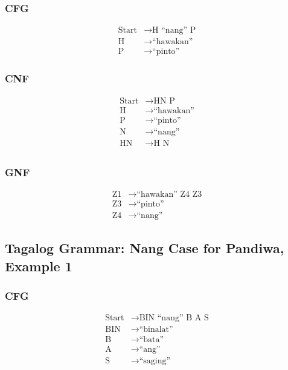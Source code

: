 \subsubsection{CFG}
\begin{equation*}
    \begin{aligned}
        \text{Start}   & \rightarrow \text{H “nang” P}   \\
        \text{H} & \rightarrow \text{“hawakan”} \\
        \text{P} & \rightarrow \text{“pinto”}
    \end{aligned}
\end{equation*}

\subsubsection{CNF}
\begin{equation*}
    \begin{aligned}
        \text{Start}   & \rightarrow \text{HN P}   \\
        \text{H} & \rightarrow \text{“hawakan”} \\
        \text{P} & \rightarrow \text{“pinto”} \\
        \text{N} & \rightarrow \text{“nang”} \\
        \text{HN} & \rightarrow \text{H N} \\
    \end{aligned}
\end{equation*}

\subsubsection{GNF}
\begin{equation*}
    \begin{aligned}
        \text{Z1}   & \rightarrow \text{“hawakan” Z4 Z3}   \\
        \text{Z3} & \rightarrow \text{“pinto”} \\
        \text{Z4} & \rightarrow \text{“nang”}
    \end{aligned}
\end{equation*}

\newpage
\subsection{Tagalog Grammar: Nang Case for Pandiwa, Example 1}
\subsubsection{CFG}
\begin{equation*}
    \begin{aligned}
        \text{Start}   & \rightarrow \text{BIN “nang” B A S}   \\
        \text{BIN} & \rightarrow \text{“binalat”} \\
        \text{B} & \rightarrow \text{“bata”} \\
        \text{A} & \rightarrow \text{“ang”} \\
        \text{S} & \rightarrow \text{“saging”}
    \end{aligned}
\end{equation*}

